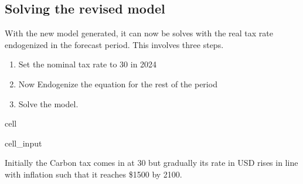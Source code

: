 \documentclass[letterpaper,10pt,english]{jupyterBook}
\begin{document}
\subsection{Solving the revised model}
\label{\detokenize{content/05_WBModels/MoreComplexScenarios:solving-the-revised-model}}
\sphinxAtStartPar
With the new model generated, it can now be solves with the real tax rate endogenized in the forecast period.  This involves three steps.
\begin{enumerate}
%
\item {} 
\sphinxAtStartPar
Set the nominal tax rate to 30 in 2024

\item {} 
\sphinxAtStartPar
Now Endogenize the equation for the rest of the period

\item {} 
\sphinxAtStartPar
Solve the model.

\end{enumerate}

\begin{sphinxuseclass}{cell}\begin{sphinxVerbatimInput}

\begin{sphinxuseclass}{cell_input}
\begin{sphinxVerbatim}[commandchars=\\\{\}]
  


  
\end{sphinxVerbatim}

\end{sphinxuseclass}\end{sphinxVerbatimInput}

\end{sphinxuseclass}
\sphinxAtStartPar
Initially the Carbon tax comes in at 30 but gradually its rate in USD rises in line with inflation such that it reaches \$1500 by 2100.
\end{document}
